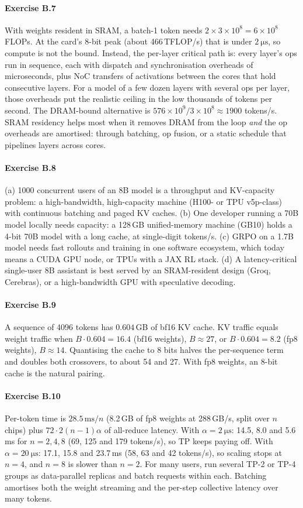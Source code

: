 \paragraph{Exercise B.7}
With weights resident in SRAM, a batch-1 token needs $2\times3\times10^8 = 6\times10^8$ FLOPs.
At the card's 8-bit peak (about 466\,TFLOP/s) that is under $\SI{2}{\micro\second}$, so compute is
not the bound. Instead, the per-layer critical path is: every layer's ops run in sequence, each with
dispatch and synchronisation overheads of microseconds, plus NoC transfers of activations between
the cores that hold consecutive layers. For a model of a few dozen layers with several ops per
layer, those overheads put the realistic ceiling in the low thousands of tokens per second. The
DRAM-bound alternative is $576\times10^9/3\times10^8\approx1900$ tokens/s. SRAM residency helps
most when it removes DRAM from the loop \emph{and} the op overheads are amortised: through batching,
op fusion, or a static schedule that pipelines layers across cores.

\paragraph{Exercise B.8}
(a) 1000 concurrent users of an 8B model is a throughput and KV-capacity problem: a high-bandwidth,
high-capacity machine (H100- or TPU v5p-class) with continuous batching and paged KV caches.
(b) One developer running a 70B model locally needs capacity: a 128\,GB unified-memory machine (GB10)
holds a 4-bit 70B model with a long cache, at single-digit tokens/s. (c) GRPO on a 1.7B model needs
fast rollouts and training in one software ecosystem, which today means a CUDA GPU node, or TPUs with a
JAX RL stack. (d) A latency-critical single-user 8B assistant is best served by an SRAM-resident
design (Groq, Cerebras), or a high-bandwidth GPU with speculative decoding.

\paragraph{Exercise B.9}
A sequence of 4096 tokens has $0.604$\,GB of bf16 KV cache. KV traffic equals weight traffic when
$B\cdot0.604 = 16.4$ (bf16 weights), $B\approx27$, or $B\cdot0.604=8.2$ (fp8 weights), $B\approx14$.
Quantising the cache to 8 bits halves the per-sequence term and doubles both crossovers, to about 54 and 27.
With fp8 weights, an 8-bit cache is the natural pairing.

\paragraph{Exercise B.10}
Per-token time is $28.5\,\text{ms}/n$ (8.2\,GB of fp8 weights at 288\,GB/s, split over $n$ chips) plus
$72\cdot2(n-1)\alpha$ of all-reduce latency. With $\alpha=\SI{2}{\micro\second}$: 14.5, 8.0 and
5.6\,ms for $n=2,4,8$ (69, 125 and 179 tokens/s), so TP keeps paying off. With
$\alpha=\SI{20}{\micro\second}$: 17.1, 15.8 and 23.7\,ms (58, 63 and 42 tokens/s), so scaling stops
at $n=4$, and $n=8$ is slower than $n=2$. For many users, run several TP-2 or TP-4 groups as data-parallel
replicas and batch requests within each. Batching amortises both the weight streaming and the
per-step collective latency over many tokens.
